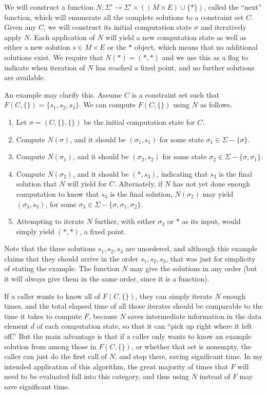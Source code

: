 \documentclass{article}
\begin{document}
We will construct a function $N:\Sigma'\to\Sigma'\times((M\times E)\cup\{*\})$, called the ``next'' function, which will enumerate all the complete solutions to a constraint set $C$.  Given any $C$, we will construct its initial computation state $\sigma$ and iteratively apply $N$.  Each application of $N$ will yield a new computation state as well as either a new solution $s\in M\times E$ or the $*$ object, which means that no additional solutions exist.  We require that $N(*)=(*,*)$ and we use this as a flag to indicate when iteration of $N$ has reached a fixed point, and no further solutions are available.

An example may clarify this.  Assume $C$ is a constraint set such that $F(C,\{\})=\{s_1,s_2,s_3\}$.  We can compute $F(C,\{\})$ using $N$ as follows.
\begin{enumerate}
\item	Let $\sigma=(C,\{\},\{\})$ be the initial computation state for $C$.
\item	Compute $N(\sigma)$, and it should be $(\sigma_1,s_1)$ for some state $\sigma_1\in\Sigma-\{\sigma\}$.
\item	Compute $N(\sigma_1)$, and it should be $(\sigma_2,s_2)$ for some state $\sigma_2\in\Sigma-\{\sigma,\sigma_1\}$.
\item	Compute $N(\sigma_2)$, and it should be $(*,s_3)$, indicating that $s_3$ is the final solution that $N$ will yield for $C$.  Alternately, if $N$ has not yet done enough computation to know that $s_3$ is the final solution, $N(\sigma_2)$ may yield $(\sigma_3,s_3)$, for some $\sigma_3\in\Sigma-\{\sigma,\sigma_1,\sigma_2\}$.
\item	Attempting to iterate $N$ further, with either $\sigma_3$ or $*$ as its input, would simply yield $(*,*)$, a fixed point.
\end{enumerate}
Note that the three solutions $s_1,s_2,s_3$ are unordered, and although this example claims that they should arrive in the order $s_1,s_2,s_3$, that was just for simplicity of stating the example.  The function $N$ may give the solutions in any order (but it will always give them in the same order, since it is a function).

If a caller wants to know all of $F(C,\{\})$, they can simply iterate $N$ enough times, and the total elapsed time of all those iterates should be comparable to the time it takes to compute $F$, because $N$ saves intermediate information in the data element $d$ of each computation state, so that it can ``pick up right where it left off.''  But the main advantage is that if a caller only wants to know an example solution from among those in $F(C,\{\})$, or whether that set is nonempty, the caller can just do the first call of $N$, and stop there, saving significant time.  In my intended application of this algorithm, the great majority of times that $F$ will need to be evaluated fall into this category, and thus using $N$ instead of $F$ may save significant time.
\end{document}
